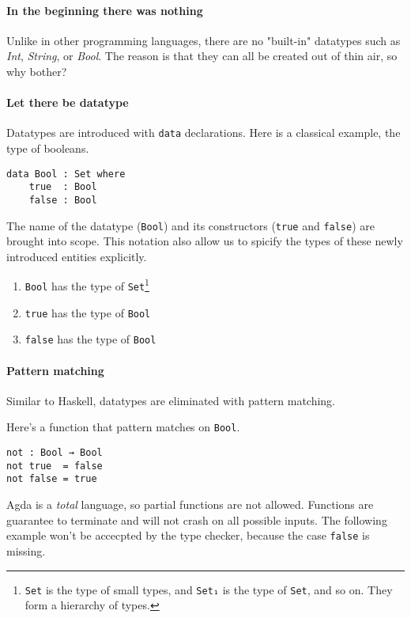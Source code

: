 \documentclass[12pt, a4paper]{article}
\begin{document}
\paragraph{In the beginning there was nothing}
Unlike in other programming languages, there are no "built-in"
datatypes such as \textit{Int}, \textit{String}, or \textit{Bool}.
The reason is that they can all be created out of thin air, so why bother?

\paragraph{Let there be datatype}
Datatypes are introduced with {\lstinline|data|} declarations. Here is a classical example, the type of booleans.

\begin{lstlisting}
data Bool : Set where
    true  : Bool
    false : Bool
\end{lstlisting}

The name of the datatype ({\lstinline|Bool|}) and its constructors ({\lstinline|true|} and {\lstinline|false|}) are brought into scope.
This notation also allow us to spicify the types of these newly introduced entities explicitly.

\begin{enumerate}
    \item {\lstinline|Bool|} has the type of {\lstinline|Set|}\footnote{{\lstinline|Set|} is the type of small types, and {\lstinline|Set₁|} is the type
of {\lstinline|Set|}, and so on. They form a hierarchy of types.}
    \item {\lstinline|true|} has the type of {\lstinline|Bool|}
    \item {\lstinline|false|} has the type of {\lstinline|Bool|}
\end{enumerate}

\paragraph{Pattern matching}
Similar to Haskell, datatypes are eliminated with pattern matching.

Here's a function that pattern matches on {\lstinline|Bool|}.

\begin{lstlisting}
not : Bool → Bool
not true  = false
not false = true
\end{lstlisting}

Agda is a \textit{total} language, so partial functions are not allowed. Functions
are guarantee to terminate and will not crash on all possible inputs. The following
example won't be accecpted by the type checker, because the case {\lstinline|false|} is missing.
\end{document}
